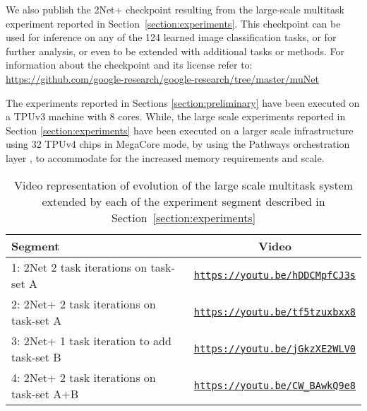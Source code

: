 \documentclass{article} \usepackage{iclr2023_conference,times}
\newcommand{\method}{2Net+\xspace}
\begin{document}
We also publish the \method checkpoint resulting from the large-scale multitask experiment reported in Section~\ref{section:experiments}.
This checkpoint can be used for inference on any of the 124 learned image classification tasks, or for further analysis, or even to be extended with additional tasks or methods.
For information about the checkpoint and its license refer to: 
\href{https://github.com/google-research/google-research/tree/master/muNet}{https://github.com/google-research/google-research/tree/master/muNet}

The experiments reported in Sections \ref{section:preliminary} have been executed on a TPUv3 \citep{Jouppi2017IndatacenterPA} machine with 8 cores.
While, the large scale experiments reported in Section \ref{section:experiments} have been executed on a larger scale infrastructure using 32 TPUv4 chips in MegaCore mode,
by using the Pathways orchestration layer \citep{Barham2022PathwaysAD}, to accommodate for the increased memory requirements and scale.

\vspace{33pt}

\begin{table}[h]
    \centering
    \caption{Video representation of evolution of the large scale multitask system extended by each of the experiment segment described in Section~\ref{section:experiments}}
    \begin{tabular}{l|c}
         Segment & Video  \\
         \hline
         1: 2Net 2 task iterations on task-set A & \href{https://youtu.be/hDDCMpfCJ3s}{\small{\texttt{https://youtu.be/hDDCMpfCJ3s}}}  \\
         2: 2Net+ 2 task iterations on task-set A & \href{https://youtu.be/tf5tzuxbxx8}{\small{\texttt{https://youtu.be/tf5tzuxbxx8}}}  \\
         3: 2Net+ 1 task iteration to add task-set B & \href{https://youtu.be/jGkzXE2WLV0}{\small{\texttt{https://youtu.be/jGkzXE2WLV0}}}  \\
         4: 2Net+ 2 task iterations on task-set A+B & \href{https://youtu.be/CW_BAwkQ9e8}{\small{\texttt{https://youtu.be/CW\_BAwkQ9e8}}}  \\
    \end{tabular}
    \label{tab:videos}
\end{table}
\end{document}
